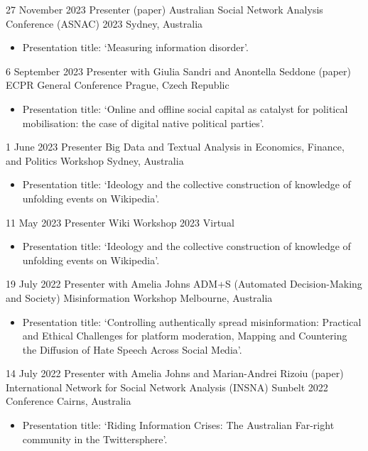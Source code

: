 \documentclass[11pt,a4paper,sans]{moderncv}
\begin{document}
\cventry 
{27 November 2023}
{Presenter (paper)}
{Australian Social Network Analysis Conference (ASNAC) 2023}
{Sydney, Australia}
{}
      {
      \begin{itemize} %
        \item {Presentation title: `Measuring information disorder'.}
      \end{itemize}
    }

\cventry 
{6 September 2023}
{Presenter with Giulia Sandri and Anontella Seddone (paper)}
{ECPR General Conference}
{Prague, Czech Republic}
{}
      {
      \begin{itemize} %
        \item {Presentation title: `Online and offline social capital as catalyst for political mobilisation: the case of digital native political parties'.}
      \end{itemize}
    }

\cventry 
{1 June 2023}
{Presenter}
{Big Data and Textual Analysis in Economics, Finance, and Politics Workshop}
{Sydney, Australia}
{}
      {
      \begin{itemize} %
        \item {Presentation title: `Ideology and the collective construction of knowledge of unfolding events on Wikipedia'.}
      \end{itemize}
    }

\cventry 
{11 May 2023}
{Presenter}
{Wiki Workshop 2023}
{Virtual}
{}
      {
      \begin{itemize} %
        \item {Presentation title: `Ideology and the collective construction of knowledge of unfolding events on Wikipedia'.}
      \end{itemize}
    }
 
\cventry %
{19 July 2022}
{Presenter with Amelia Johns}
{ADM+S (Automated Decision-Making and Society) Misinformation Workshop}
{Melbourne, Australia}
{}
      {
      \begin{itemize} %
        \item {Presentation title: `Controlling authentically spread misinformation: Practical and Ethical
Challenges for platform moderation, Mapping and Countering the Diffusion of Hate Speech Across Social Media'.}
      \end{itemize}
    }

\cventry %
{14 July 2022}
{Presenter with Amelia Johns and Marian-Andrei Rizoiu (paper)}
{International Network for Social Network Analysis (INSNA) Sunbelt 2022 Conference}
{Cairns, Australia}
{}
       {
      \begin{itemize} %
        \item {Presentation title: `Riding Information Crises: The
            Australian Far-right community in the Twittersphere'.}
      \end{itemize}
    }
\end{document}
